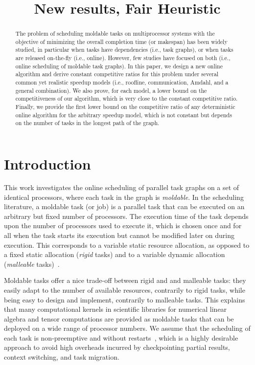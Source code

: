 \documentclass{article}
\newcommand{\LP}[2][inline]{\todo[color=green!50,#1]{\sf \textbf{Lucas:} #2}
\xspace}
\begin{document}
\title{New results, Fair Heuristic}

\begin{abstract}
\LP{From TOPC paper}
The problem of scheduling moldable tasks on multiprocessor systems with the objective of minimizing the overall completion time (or makespan) has been widely studied, in particular
when tasks have dependencies (i.e., task graphs), or when tasks are released on-the-fly
(i.e., online). However, few studies have focused on both (i.e., online scheduling of moldable task graphs).
In this paper, we design a new online algorithm and derive constant competitive ratios for this problem under several common yet realistic
speedup models (i.e., roofline, communication, Amdahl, and a general combination).
We also prove, for each model, a lower bound on the competitiveness of our algorithm, which is very close to the constant competitive ratio.
Finally, we provide the first lower bound on the competitive ratio of any deterministic online algorithm for the arbitrary speedup model,
which is not constant but depends on the number of tasks in the longest path of the graph.
\end{abstract}


\maketitle

\section{Introduction}
\LP{From TOPC24 paper}
This work investigates the online scheduling of parallel task graphs on a set of identical processors, where each task in the graph is \emph{moldable}.
In the scheduling literature, a moldable task (or job) is a parallel task that can be executed on an arbitrary but fixed number of processors. The execution time of the task depends upon the number of processors used to execute it, which is chosen once and for all when the task starts its execution but cannot be modified later on during execution. This corresponds to a variable static resource allocation, as opposed to a fixed static allocation (\emph{rigid} tasks) and to a variable dynamic allocation (\emph{malleable} tasks)~\cite{Feitelson96}.

Moldable tasks offer a nice trade-off between rigid and and malleable tasks: they easily adapt to the number of available resources, contrarily to rigid tasks, while being easy to design and implement, contrarily to malleable tasks. This explains that many computational kernels in scientific libraries for numerical linear algebra and tensor computations are provided as moldable tasks that can be deployed on a wide range of processor numbers. We assume that the scheduling of each task is non-preemptive and without restarts~\cite{Feldmann98_DAG}, which is a highly desirable approach to avoid high overheads incurred by checkpointing partial results, context switching, and  task migration.
\end{document}
